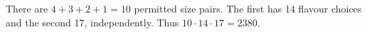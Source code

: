 There are $4+3+2+1=10$ permitted size pairs. The first has 14 flavour choices and the second 17, independently. Thus $10\cdot14\cdot17=\boxed{2380}$.
